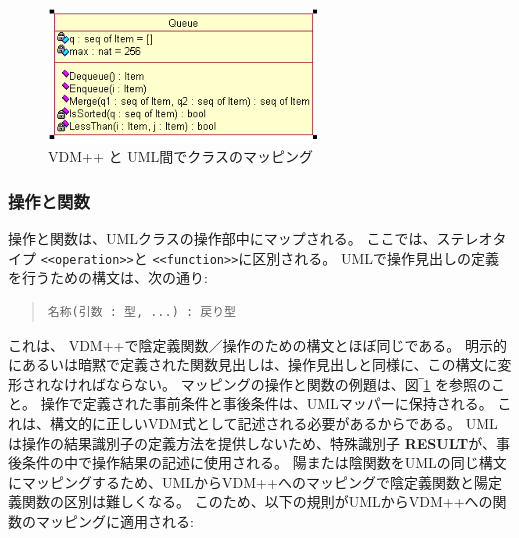 \documentclass[\pformat,12pt]{jarticle}
\newcommand{\vdmpp}{VDM++}
\begin{document}
\begin{figure}[p]
\begin{center}
\hspace{-2cm}
\begin{minipage}[t]{2.5in}
\end{minipage} \ \
\begin{minipage}[t]{2in}
\vspace{2cm}
\includegraphics[width=2.8in]{queueClass}
\end{minipage}
\caption{\vdmpp{} と UML\label{fig:queue}間でクラスのマッピング　\label{fig:queue}}
\end{center}
\end{figure}

\subsubsection*{操作と関数}
  
操作と関数は、UMLクラスの操作部中にマップされる。
ここでは、ステレオタイプ {\tt <<operation>>}と {\tt <<function>>}に区別される。 
UMLで操作見出しの定義を行うための構文は、次の通り:

\begin{quote}
\begin{verbatim}
名称(引数 : 型, ...) : 戻り型  
\end{verbatim}
\end{quote}
  
これは、 \vdmpp{}で陰定義関数／操作のための構文とほぼ同じである。
明示的にあるいは暗黙で定義された関数見出しは、操作見出しと同様に、この構文に変形されなければならない。
マッピングの操作と関数の例題は、図‾\ref{fig:queue} を参照のこと。
操作で定義された事前条件と事後条件は、UMLマッパーに保持される。
これは、構文的に正しいVDM式として記述される必要があるからである。
 UML は操作の結果識別子の定義方法を提供しないため、特殊識別子 \textbf{RESULT}が、事後条件の中で操作結果の記述に使用される。
陽または陰関数をUMLの同じ構文にマッピングするため、UMLから\vdmpp{}へのマッピングで陰定義関数と陽定義関数の区別は難しくなる。
このため、以下の規則がUMLから\vdmpp{}への関数のマッピングに適用される:
\end{document}

